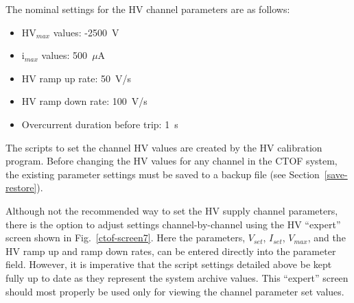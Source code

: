 \documentclass[12pt]{article}
\begin{document}
The nominal settings for the HV channel parameters are as follows:

\begin{itemize}
\item HV$_{max}$ values: -2500~V
\item i$_{max}$ values: 500~$\mu$A
\item HV ramp up rate: 50~V/s
\item HV ramp down rate: 100~V/s
\item Overcurrent duration before trip: 1~s
\end{itemize}

The scripts to set the channel HV values are created by the HV calibration program. 
Before changing the HV values for any channel in the CTOF system, the existing 
parameter settings must be saved to a backup file (see Section~\ref{save-restore}).

Although not the recommended way to set the HV supply channel parameters, there is 
the option to adjust settings channel-by-channel using the HV ``expert'' screen shown 
in Fig.~\ref{ctof-screen7}. Here the parameters, $V_{set}$, $I_{set}$, $V_{max}$, and 
the HV ramp up and ramp down rates, can be entered directly into the parameter field. 
However, it is imperative that the script settings detailed above be kept fully up 
to date as they represent the system archive values. This ``expert'' screen should 
most properly be used only for viewing the channel parameter set values.
\end{document}
